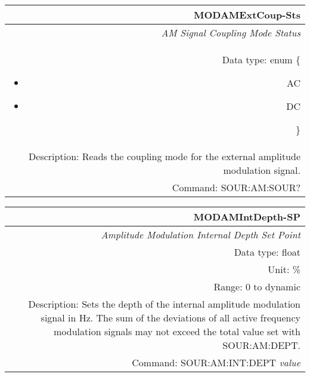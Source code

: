 \documentclass[openany]{article}
\begin{document}
		\begin{tabular}{N}
			\hline
			\bfseries MODAMExtCoup-Sts \\ \hline
			\emph{AM Signal Coupling Mode Status} \\
			Data type: enum \{\begin{itemize}[noitemsep]
				\small
				\item[] AC
				\item[] DC
			\end{itemize}\} \\ 
			Description: Reads the coupling mode for the external amplitude modulation signal. \\
			Command: SOUR:AM:SOUR? \\

		\end{tabular}
%
		\begin{tabular}{N}
			\hline
			\bfseries MODAMIntDepth-SP \\ \hline
			\emph{Amplitude Modulation Internal Depth Set Point} \\
			Data type: float \\
			Unit: \% \\
			Range: 0 to dynamic \\
			Description: Sets the depth of the internal amplitude modulation signal in Hz. The sum of the deviations of all active frequency modulation signals may not exceed the total value set with SOUR:AM:DEPT. \\
			Command: SOUR:AM:INT:DEPT \emph{value} \\
			
		\end{tabular}
\end{document}
